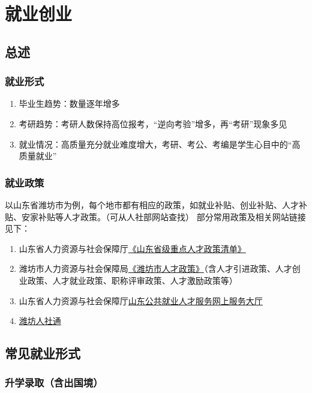 \chapter[就业创业]{就业创业\footnotemark}

\section[总述]{总述}
\subsection[就业形式]{就业形式}
\begin{enumerate}
    \item 毕业生趋势：数量逐年增多
    \item 考研趋势：考研人数保持高位报考，“逆向考验”增多，再“考研”现象多见
    \item 就业情况：高质量充分就业难度增大，考研、考公、考编是学生心目中的“高质量就业”
\end{enumerate}

\subsection[就业政策]{就业政策}
以山东省潍坊市为例，每个地市都有相应的政策，如就业补贴、创业补贴、人才补贴、安家补贴等人才政策。（可从人社部网站查找）
\bigbreak
部分常用政策及相关网站链接见下：
\begin{enumerate}
    \item 山东省人力资源与社会保障厅\href{http://hrss.shandong.gov.cn/articles/ch00300/202404/9dfeed90-6eb1-41dc-9ab3-a0fcedef8491.shtml}{《山东省级重点人才政策清单》}
    \item 潍坊市人力资源与社会保障局\href{http://rsj.weifang.gov.cn/zcfg/rszc/rczc}{《潍坊市人才政策》}（含人才引进政策、人才创业政策、人才就业政策、职称评审政策、人才激励政策等）
    \item 山东省人力资源与社会保障厅\href{http://103.239.153.109/sdjyweb/index.action}{山东公共就业人才服务网上服务大厅}
    \item \href{https://m12333.cn/weifang.aspx}{潍坊人社通}
\end{enumerate}

\section[常见就业形式]{常见就业形式}
\subsection[升学录取（含出国境）]{升学录取（含出国境）}
